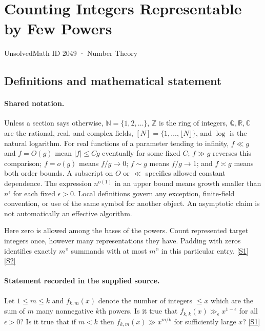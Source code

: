 \documentclass[11pt,a4paper]{article}
\newcommand{\N}{\mathbb{N}}
\newcommand{\Z}{\mathbb{Z}}
\newcommand{\Q}{\mathbb{Q}}
\newcommand{\R}{\mathbb{R}}
\newcommand{\C}{\mathbb{C}}
\newcommand{\sref}[2]{\hyperlink{source:#1:#2}{[S#2]}}
\begin{document}

\setcounter{section}{2048}

\section{Counting Integers Representable by Few Powers}\label{2049}

{\small\sffamily UnsolvedMath ID 2049 · Number Theory}

\subsection{Definitions and mathematical statement}

\paragraph{Shared notation.}Unless a section says otherwise, $\N=\{1,2,\ldots\}$,
$\Z$ is the ring of integers, $\Q,\R,\C$ are the rational, real, and complex
fields, $[N]=\{1,\ldots,\lfloor N\rfloor\}$, and $\log$ is the natural
logarithm. For real functions of a parameter tending to infinity,
$f\ll g$ and $f=O(g)$ mean $|f|\leq Cg$ eventually for some fixed $C$;
$f\gg g$ reverses this comparison; $f=o(g)$ means $f/g\to0$;
$f\sim g$ means $f/g\to1$; and $f\asymp g$ means both order bounds.
A subscript on $O$ or $\ll$ specifies allowed constant dependence.
The expression $n^{o(1)}$ in an upper bound means growth smaller than
$n^\epsilon$ for each fixed $\epsilon>0$. Local definitions govern any
exception, finite-field convention, or use of the same symbol for another
object. An asymptotic claim is not automatically an effective algorithm.



Here zero is allowed among the bases of the powers. Count represented target integers once, however many representations they have. Padding with zeros identifies exactly $m$'' summands with at most $m$'' in this particular entry. \sref{2049}{1} \sref{2049}{2}

\paragraph{Statement recorded in the supplied source.}
Let $1\leq m\leq k$ and $f_{k,m}(x)$ denote the number of integers $\leq x$ which are the sum of $m$ many nonnegative $k$th powers. Is it true that $ f_{k,k}(x) \gg_\epsilon x^{1-\epsilon} $ for all $\epsilon>0$? Is it true that if $m<k$ then $ f_{k,m}(x) \gg x^{m/k} $ for sufficiently large $x$? \sref{2049}{1}
\end{document}
